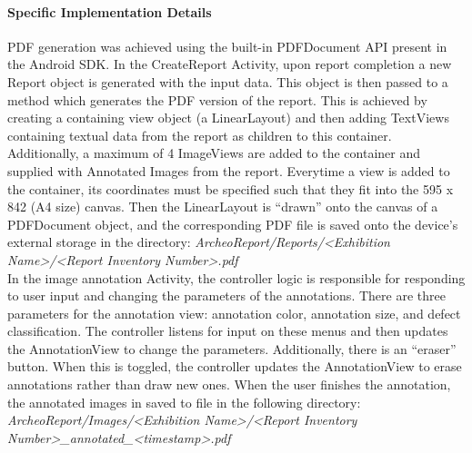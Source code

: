 \documentclass[12pt]{article}
\begin{document}
\paragraph{Specific Implementation Details}
PDF generation was achieved using the built-in PDFDocument API present in the Android SDK. In the CreateReport Activity, upon report completion a new Report object is generated with the input data. This object is then passed to a method which generates the PDF version of the report. This is achieved by creating a containing view object (a LinearLayout) and then adding TextViews containing textual data from the report as children to this container. Additionally, a maximum of 4 ImageViews are added to the container and supplied with Annotated Images from the report. Everytime a view is added to the container, its coordinates must be specified such that they fit into the 595 x 842 (A4 size) canvas. Then the LinearLayout is ``drawn'' onto the canvas of a PDFDocument object, and the corresponding PDF file is saved onto the device's external storage in the directory: \textit{ArcheoReport/Reports/<Exhibition Name>/<Report Inventory Number>.pdf} \\

In the image annotation Activity, the controller logic is responsible for responding to user input and changing the parameters of the annotations. There are three parameters for the annotation view: annotation color, annotation size, and defect classification. The controller listens for input on these menus and then updates the AnnotationView to change the parameters. Additionally, there is an ``eraser'' button. When this is toggled, the controller updates the AnnotationView to erase annotations rather than draw new ones. When the user finishes the annotation, the annotated images in saved to file in the following directory: \textit{ArcheoReport/Images/<Exhibition Name>/<Report Inventory Number>_annotated_<timestamp>.pdf} \\
\end{document}
